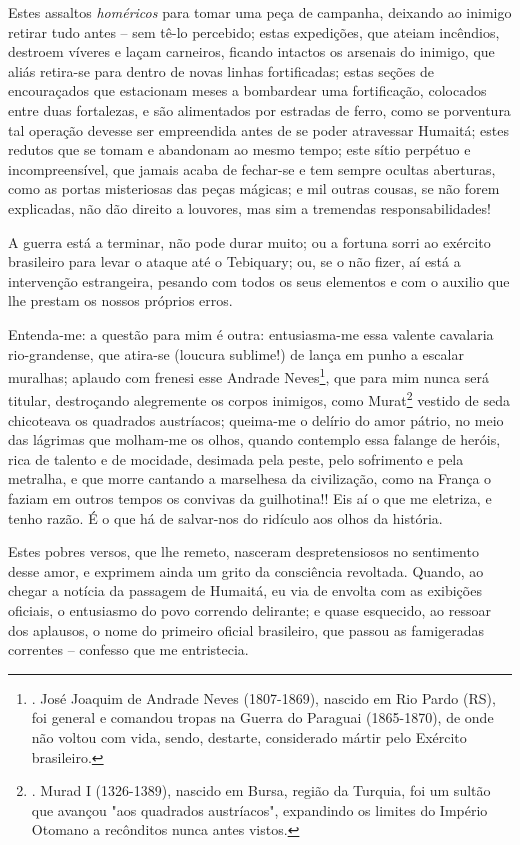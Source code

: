 Estes assaltos \emph{homéricos} para tomar uma peça de campanha,
deixando ao inimigo retirar tudo antes -- sem tê-lo percebido; estas
expedições, que ateiam incêndios, destroem víveres e laçam carneiros,
ficando intactos os arsenais do inimigo, que aliás retira-se para dentro
de novas linhas fortificadas; estas seções de encouraçados que
estacionam meses a bombardear uma fortificação, colocados entre duas
fortalezas, e são alimentados por estradas de ferro, como se porventura
tal operação devesse ser empreendida antes de se poder atravessar
Humaitá; estes redutos que se tomam e abandonam ao mesmo tempo; este
sítio perpétuo e incompreensível, que jamais acaba de fechar-se e tem
sempre ocultas aberturas, como as portas misteriosas das peças mágicas;
e mil outras cousas, se não forem explicadas, não dão direito a
louvores, mas sim a tremendas responsabilidades!

A guerra está a terminar, não pode durar muito; ou a fortuna sorri ao
exército brasileiro para levar o ataque até o Tebiquary; ou, se o não
fizer, aí está a intervenção estrangeira, pesando com todos os seus
elementos e com o auxilio que lhe prestam os nossos próprios erros.

Entenda-me: a questão para mim é outra: entusiasma-me essa valente
cavalaria rio-grandense, que atira-se (loucura sublime!) de lança em
punho a escalar muralhas; aplaudo com frenesi esse Andrade
Neves\footnote{. José Joaquim de Andrade Neves (1807-1869), nascido em
  Rio Pardo (RS), foi general e comandou tropas na Guerra do Paraguai
  (1865-1870), de onde não voltou com vida, sendo, destarte, considerado
  mártir pelo Exército brasileiro.}, que para mim nunca será titular,
destroçando alegremente os corpos inimigos, como Murat\footnote{. Murad
  I (1326-1389), nascido em Bursa, região da Turquia, foi um sultão que
  avançou "aos quadrados austríacos", expandindo os limites do Império
  Otomano a recônditos nunca antes vistos.} vestido de seda chicoteava
os quadrados austríacos; queima-me o delírio do amor pátrio, no meio das
lágrimas que molham-me os olhos, quando contemplo essa falange de
heróis, rica de talento e de mocidade, desimada pela peste, pelo
sofrimento e pela metralha, e que morre cantando a marselhesa da
civilização, como na França o faziam em outros tempos os convivas da
guilhotina!! Eis aí o que me eletriza, e tenho razão. É o que há de
salvar-nos do ridículo aos olhos da história.

Estes pobres versos, que lhe remeto, nasceram despretensiosos no
sentimento desse amor, e exprimem ainda um grito da consciência
revoltada. Quando, ao chegar a notícia da passagem de Humaitá, eu via de
envolta com as exibições oficiais, o entusiasmo do povo correndo
delirante; e quase esquecido, ao ressoar dos aplausos, o nome do
primeiro oficial brasileiro, que passou as famigeradas correntes --
confesso que me entristecia.

